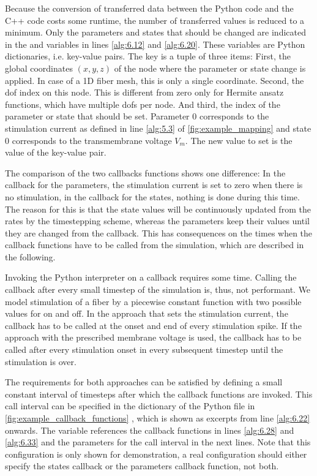 Because the conversion of transferred data between the Python code and the C++ code costs some runtime, the number of transferred values is reduced to a minimum. Only the parameters and states that should be changed are indicated in the  and  variables in lines \ref{alg:6.12} and \ref{alg:6.20}. These variables are Python dictionaries, i.e. key-value pairs. The key is a tuple of three items: First, the global coordinates $(x,y,z)$ of the node where the parameter or state change is applied. In case of a 1D fiber mesh, this is only a single coordinate. Second, the dof index on this node. This is different from zero only for Hermite ansatz functions, which have multiple dofs per node. And third, the index of the parameter or state that should be set. Parameter 0 corresponds to the stimulation current as defined in line \ref{alg:5.3} of \cref{fig:example_mapping} and state 0 corresponds to the transmembrane voltage $V_m$. The new value to set is the value of the key-value pair.

The comparison of the two callbacks functions shows one difference: In the callback for the parameters, the stimulation current is set to zero when there is no stimulation, in the callback for the states, nothing is done during this time. The reason for this is that the state values will be continuously updated from the rates by the timestepping scheme, whereas the parameters keep their values until they are changed from the callback. This has consequences on the times when the callback functions have to be called from the simulation, which are described in the following.

Invoking the Python interpreter on a callback requires some time. Calling the callback after every small timestep of the simulation is, thus, not performant. We model stimulation of a fiber by a piecewise constant function with two possible values for on and off.
In the approach that sets the stimulation current, the callback  has to be called at the onset and end of every stimulation spike. If the approach with the prescribed membrane voltage is used, the callback  has to be called after every stimulation onset in every subsequent timestep until the stimulation is over.

The requirements for both approaches can be satisfied by defining a small constant interval of timesteps after which the callback functions are invoked. This call interval can be specified in the  dictionary of the Python file in \cref{fig:example_callback_functions} , which is shown as excerpts from line \ref{alg:6.22} onwards. The  variable references the callback functions in lines \ref{alg:6.28} and \ref{alg:6.33} and the parameters for the call interval in the next lines. Note that this configuration is only shown for demonstration, a real configuration should either specify the states callback or the parameters callback function, not both.

